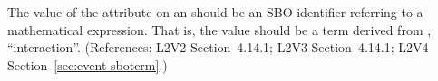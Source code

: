 The value of the  attribute on an \Event should be
an SBO identifier referring to a mathematical expression.  That is, the
value should be a term derived from \sbointeractionID,
``interaction''.  (References: L2V2 Section~4.14.1; L2V3
Section~4.14.1; L2V4 Section~\ref{sec:event-sboterm}.)
